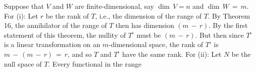 Suppose that \(V\) and \(W\) are finite-dimensional, say \(\dim\,V=n\) and \(\dim\,W\,=\,m\). For (i): Let \(r\) be the rank of \(T\), i.e., the dimension of the range of \(T\). By Theorem 16, the annihilator of the range of \(T\) then has dimension \((m\,-\,r)\). By the first statement of this theorem, the nullity of \(T^{\iota}\) must be \((m\,-\,r)\). But then since \(T^{\iota}\) is a linear transformation on an \(m\)-dimensional space, the rank of \(T^{\iota}\) is \(m\,-\,(m\,-\,r)\,=\,r\), and so \(T\) and \(T^{\iota}\) have the same rank. For (ii): Let \(N\) be the null space of \(T\). Every functional in the range 